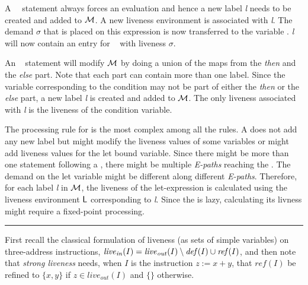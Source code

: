 \documentclass{sig-alternate}
\begin{document}
 
  A {\RETURN~\px}\  statement always forces an evaluation and hence a new 
  label {\em l} needs to be created and added to $\cal{M}$. A new liveness
  environment is associated with {\em l}. The demand $\sigma$ that is placed 
  on this expression is now transferred to the variable \px. {\em l} will now
  contain an entry for \px~ with liveness $\sigma$.

  An \SIF~ statement will modify  $\cal{M}$ by doing a union of 
  the maps from the {\em then} and the {\em else} part. Note that each part can contain 
  more than one label. Since the variable corresponding to the condition may not
  be part of either the {\em then} or the {\em else} part, a new label {\em l} is created 
  and added to $\cal{M}$. The only liveness associated with {\em l} is the liveness 
  of the condition variable.
  
  The processing rule for {\LET} is the most complex among all the rules. A {\LET} does
  not add any new label but might modify the liveness values of some variables or might add 
  liveness values for the let bound variable. Since there might be more than one {\RETURN} 
  statement following a {\LET}, there might be multiple {\em E-paths} reaching the {\LET}.
  The demand on the let variable might be different along different {\em E-paths}. Therefore,
  for each label {\em l} in $\cal{M}$, the liveness of the let-expression is calculated using 
  the liveness environment $\mathsf{L}$ corresponding to {\em l}. Since the {\LET} is lazy, 
  calculating its livness might require a fixed-point processing. 
  

\bigskip
\hrule 
\bigskip

First recall the classical formulation  of liveness (as sets of simple
variables)        on        three-address       instructions,        $
\mathit{live}_\mathit{in}(I) = \mathit{live}_\mathit{out}(I) \setminus
\mathit{def\/}(I) \cup  \mathit{ref\/}(I) $,  and then note  that {\em
  strong liveness}  needs, when $I$ is the  instruction $z:=x+y$, that
$\mathit{ref}(I)$     be     refined     to    $\{x,y\}$     if     $z
\in\mathit{live}_\mathit{out}(I)$ and $\{\}$ otherwise.
\end{document}
